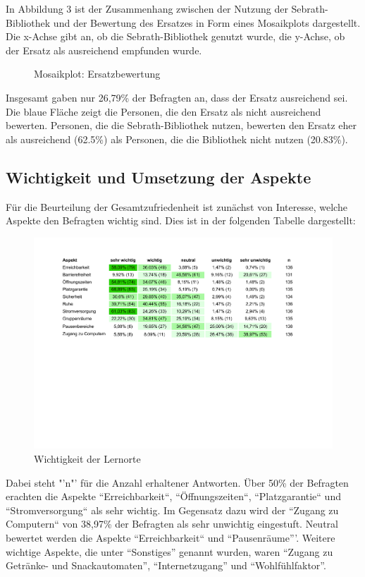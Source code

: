 \documentclass[11pt, a4paper]{article}
\begin{document}
	In Abbildung 3 ist der Zusammenhang zwischen der Nutzung der Sebrath-Bibliothek  und der Bewertung des Ersatzes in Form eines Mosaikplots dargestellt. Die x-Achse gibt an, ob die Sebrath-Bibliothek genutzt wurde, die y-Achse, ob der Ersatz als ausreichend empfunden wurde. 
	\begin{figure}[h]
	 \begin{center}
	{\centering } \end{center}
	\vspace{-1.5cm}
	\caption{Mosaikplot: Ersatzbewertung}
\end{figure}


\newpage
Insgesamt gaben nur 26,79\% der Befragten an, dass der Ersatz ausreichend sei. Die blaue Fläche zeigt die Personen, die den Ersatz als nicht ausreichend bewerten. Personen, die die Sebrath-Bibliothek nutzen, bewerten den Ersatz eher als ausreichend (62.5\%) als Personen, die die Bibliothek nicht nutzen (20.83\%).

\subsection{Wichtigkeit und Umsetzung der Aspekte}
Für die Beurteilung der Gesamtzufriedenheit ist zunächst von Interesse, welche Aspekte den Befragten wichtig sind. Dies ist in der folgenden Tabelle dargestellt:

\begin{figure}[htbp]
	\vspace*{6.2cm}
	\hspace*{-1.95cm}
	\includegraphics[scale = 0.746, trim=0.5cm 11cm 0.5cm 11cm]{Tabellen.pdf}
		\vspace{-0.34cm}
	\caption{Wichtigkeit der Lernorte}
	\vspace{0.28cm}
\end{figure}
   Dabei steht "'n"' für die Anzahl erhaltener Antworten. Über 50\% der Befragten erachten die Aspekte “Erreichbarkeit“, “Öffnungszeiten“, “Platzgarantie“ und “Stromversorgung“ als sehr wichtig. Im Gegensatz dazu wird der “Zugang zu Computern“ von 38,97\% der Befragten als sehr unwichtig eingestuft. Neutral bewertet werden die Aspekte “Erreichbarkeit“ und “Pausenräume”'. Weitere wichtige Aspekte, die unter “Sonstiges” genannt wurden, waren “Zugang zu Getränke- und Snackautomaten”, “Internetzugang” und “Wohlfühlfaktor”.
\end{document}
